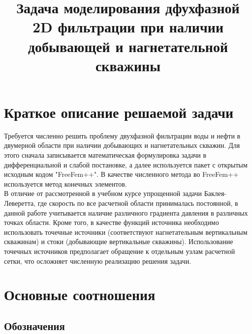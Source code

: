 


\title{Задача моделирования дфухфазной 2D фильтрации при наличии добывающей и нагнетательной скважины}


\maketitle



\section{Краткое описание решаемой задачи}

Требуется численно решить проблему двухфазной фильтрации воды и нефти в двумерной области при 
наличии добывающих и нагнетательных скважин. Для этого сначала записывается математическая 
формулировка задачи в дифференциальной и слабой постановке,
а далее используется пакет с открытым исходным кодом "FreeFem++". В качестве численного
метода во FreeFem++ используется метод конечных элементов.\\
В отличие от рассмотренной в учебном курсе упрощенной задачи Баклея-Леверетта, где скорость по
все расчетной области принималась постоянной, в данной работе учитывается 
наличие различного градиента давления в различных точках области. Кроме того, в качестве
функций источника необходимо использовать точечные источники (соответствуют нагнетательным
вертикальным скважинам) и стоки (добывающие вертикальные скважины). Использование точечных 
источников предполагает обращение к отдельным узлам расчетной сетки, что осложняет численную
реализацию решения задачи.

\section{Основные соотношения}

\subsection{Обозначения}

